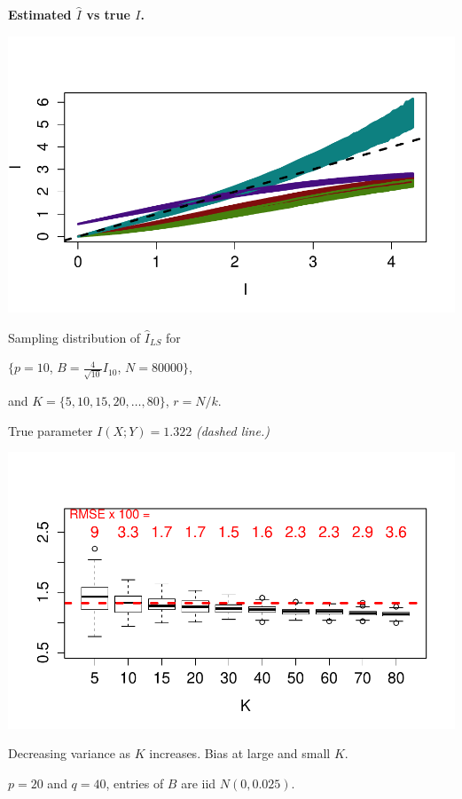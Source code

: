 \documentclass{article}
\begin{document}
\begin{center}
\textbf{Estimated $\hat{I}$ vs true $I$.} 

\includegraphics[scale = 0.5, clip=true, trim=0.4in 0.5in 0 0.5in]{../info_theory_sims/fig4.pdf}
\end{center}

Sampling distribution of $\hat{I}_{LS}$ for \small{$\{p = 10$, $B = \frac{4}{\sqrt{10}} I_{10}$, $N = 80000\}$,

and $K = \{5, 10, 15, 20, \hdots, 80\}$, $r = N/k$.}

True parameter $I(X; Y) = 1.322$ \emph{(dashed line.)}
\begin{center}
\includegraphics[scale = 0.6, clip = true, trim = 0 0.5in 0 0.5in]{../info_theory_sims/fig5a.pdf}
\end{center}

Decreasing variance as $K$ increases. Bias at large and small $K$.

$p = 20$ and $q = 40$, entries of $B$ are iid $N(0, 0.025)$.
\end{document}
